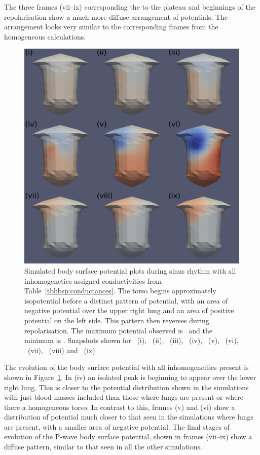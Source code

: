 The three frames (vii--ix) corresponding the to the plateau and beginnings of the
repolarisation show a much more diffuse arrangement of potentials.
The arrangement looks very similar to the corresponding frames from the
homogeneous calculations.


\begin{figure}
\includegraphics{figures/bsp/bsp_all}
\caption[Body Surface Potential snapshots, with all inhomogeneities]{
\label{bsp:fig:all_bsp}
Simulated body surface potential plots during sinus rhythm with all
inhomogeneties assigned conductivities from Table~\ref{tbl:bsp:conductances}.
The torso begins approximately isopotential before a distinct pattern of
potential, with an area of negative potential over the upper right lung and an
area of positive potential on the left side.
This pattern then reverses during repolarisation.
The maximum potential observed is \ and the minimum is .
Snapshots shown for \ (i), \ (ii), \ (iii), \ (iv),
\ (v), \ (vi), \ (vii), \ (viii) and \
(ix)
}
\end{figure}

The evolution of the body surface potential with all inhomogeneities present is
shown in Figure~\ref{bsp:fig:all_bsp}.
In (iv) an isolated peak is beginning to appear over the lower
right lung.
This is closer to the potential distribution shown in the simulations with just
blood masses included than those where lungs are present or where there a
homogeneous torso.
In contrast to this, frames (v) and (vi) show a distribution of potential much
closer to that seen in the simulations where lungs are present, with a smaller
area of negative potential.
The final stages of evolution of the P-wave body surface potential, shown in
frames (vii--ix) show a diffuse pattern, similar to that seen in all the other
simulations.

